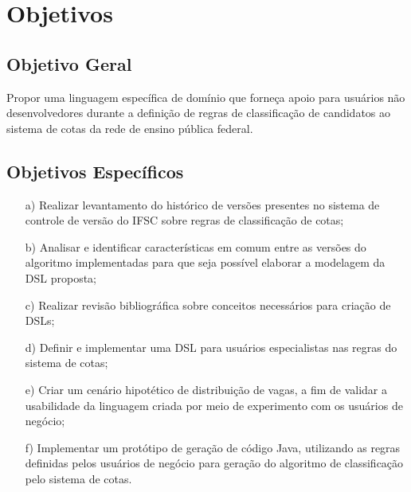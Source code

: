 \section{Objetivos}
\label{objetivos}

\subsection{Objetivo Geral}
\label{objetivogeral}

Propor uma linguagem específica de domínio que forneça apoio para usuários não desenvolvedores durante a definição de regras de classificação de candidatos ao sistema de cotas da rede de ensino pública federal.

\subsection{Objetivos Específicos}
\label{objetivosespecificos}

\begin{enumerate}
    \item[a)] Realizar levantamento do histórico de versões presentes no sistema de controle de versão do \gls{IFSC} sobre regras de classificação de cotas;
    \item[b)] Analisar e identificar características em comum entre as versões do algoritmo implementadas para que seja possível elaborar a modelagem da \gls{DSL} proposta;
    \item[c)] Realizar revisão bibliográfica sobre conceitos necessários para criação de \gls{DSL}s;
    \item[d)] Definir e implementar uma \gls{DSL} para usuários especialistas nas regras do sistema de cotas;
    \item[e)] Criar um cenário hipotético de distribuição de vagas, a fim de validar a usabilidade da linguagem criada por meio de experimento com os usuários de negócio;
    \item[f)] Implementar um protótipo de geração de código Java, utilizando as regras definidas pelos usuários de negócio para geração do algoritmo de classificação pelo sistema de cotas.
\end{enumerate}{}